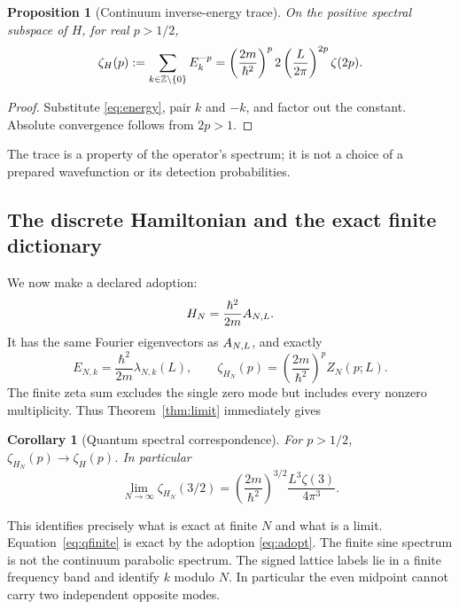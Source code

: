 \documentclass[11pt,a4paper]{article}
\newtheorem{proposition}[theorem]{Proposition}
\newtheorem{corollary}[theorem]{Corollary}
\theoremstyle{definition}\newtheorem{definition}[theorem]{Definition}
\theoremstyle{remark}\newtheorem{remark}[theorem]{Remark}
\numberwithin{equation}{section}
\begin{document}
\begin{proposition}[Continuum inverse-energy trace]\label{prop:qtrace}
On the positive spectral subspace of \(H\), for real \(p>1/2\),
\begin{equation}
 \zeta_H(p):=\sum_{k\in\mathbb Z\setminus\{0\}}E_k^{-p}
 =\left(\frac{2m}{\hbar^2}\right)^p
     2\left(\frac{L}{2\pi}\right)^{2p}\zeta(2p).
 \label{eq:qtrace}
\end{equation}
\end{proposition}
\begin{proof}
Substitute \eqref{eq:energy}, pair \(k\) and \(-k\), and factor out
the constant. Absolute convergence follows from \(2p>1\).
\end{proof}
The trace is a property of the operator's spectrum; it is not a choice of
a prepared wavefunction or its detection probabilities.

\subsection{The discrete Hamiltonian and the exact finite dictionary}
We now make a declared adoption:
\begin{equation}
 H_N=\frac{\hbar^2}{2m}A_{N,L}.
 \label{eq:adopt}
\end{equation}
It has the same Fourier eigenvectors as \(A_{N,L}\), and exactly
\begin{equation}
 E_{N,k}=\frac{\hbar^2}{2m}\lambda_{N,k}(L),\qquad
 \zeta_{H_N}(p)=\left(\frac{2m}{\hbar^2}\right)^p Z_N(p;L).
 \label{eq:qfinite}
\end{equation}
The finite zeta sum excludes the single zero mode but includes every
nonzero multiplicity. Thus Theorem~\ref{thm:limit} immediately gives
\begin{corollary}[Quantum spectral correspondence]\label{cor:quantum}
For \(p>1/2\), \(\zeta_{H_N}(p)\to\zeta_H(p)\). In particular
\begin{equation}
 \boxed{\displaystyle
 \lim_{N\to\infty}\zeta_{H_N}(3/2)
 =\left(\frac{2m}{\hbar^2}\right)^{3/2}
   \frac{L^3\zeta(3)}{4\pi^3}.}
 \label{eq:qmain}
\end{equation}
\end{corollary}

This identifies precisely what is exact at finite \(N\) and what is a
limit. Equation~\eqref{eq:qfinite} is exact by the adoption
\eqref{eq:adopt}. The finite sine spectrum is not the continuum
parabolic spectrum. The signed lattice labels lie in a finite frequency
band and identify \(k\) modulo \(N\). In particular the even midpoint
cannot carry two independent opposite modes.
\end{document}
